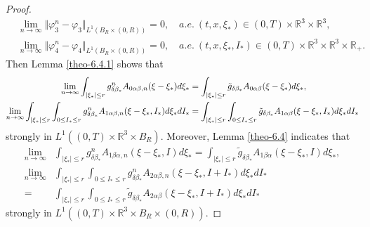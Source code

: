\documentclass[10pt,a4paper]{amsart}
\def\R{\mathbb{R}}
\begin{document}
\begin{proof}
\begin{equation*}
\begin{aligned}
		& \lim \limits_{n\rightarrow \infty } \Vert \varphi^n_3 -\varphi_3 \Vert_{L^1(B_R\times (0,R))}=0, \quad a.e. \ (t,x,\xi_*) \in (0,T)\times \R^3 \times \R^3, \\
		& \lim \limits_{n\rightarrow \infty } \Vert \varphi^n_4 -\varphi_4 \Vert_{L^1(B_R\times (0,R) )}=0, \quad a.e. \ (t,x,\xi_* ,I_*) \in (0,T)\times \R^3 \times \R^3 \times \R_+ . 
	\end{aligned}
\end{equation*}
Then Lemma \ref{theo-6.4.1} shows that
\begin{equation*}{\small
	\begin{aligned}
		\lim \limits_{n\rightarrow \infty } \int_{|\xi_* |\leq r} g^n_{\delta \beta_* } A_{0\alpha \beta ,n}(\xi -\xi_* ) d\xi_* &=\int_{|\xi_* |\leq r} \tilde{g}_{\delta \beta_*} A_{0\alpha \beta } (\xi -\xi_* )d\xi_*, \\
		\lim \limits_{n\rightarrow \infty } \int_{|\xi_* |\leq r} \int_{0\leq I_* \leq r} g^n_{\delta \beta_*} A_{1\alpha \beta ,n}(\xi -\xi_* ,I_* ) d\xi_* dI_*&=\int_{|\xi_* |\leq r} \int_{0\leq I_* \leq r} \tilde{g}_{\delta \beta_*} A_{1\alpha \beta } (\xi -\xi_* ,I_* )d\xi_* dI_*
	\end{aligned}}
\end{equation*}
strongly in $L^1((0,T)\times \R^3 \times B_R )$. Moreover, Lemma \ref{theo-6.4} indicates that
\begin{equation*}
	\begin{aligned}
		\lim \limits_{n\rightarrow \infty } &\int_{|\xi_* |\leq r} g^n_{\delta \beta_*} A_{1\beta \alpha ,n}(\xi -\xi_* ,I) d\xi_* =\int_{|\xi_* |\leq r} \tilde{g}_{\delta \beta_*} A_{1\beta \alpha }(\xi -\xi_* ,I) d\xi_*, \\
		\lim \limits_{n\rightarrow \infty } &\int_{|\xi_* |\leq r} \int_{0\leq I_* \leq r} g^n_{\delta \beta_*} A_{2\alpha \beta ,n}(\xi -\xi_* ,I+I_* ) d\xi_* dI_*\\
		=&\int_{|\xi_* |\leq r} \int_{0\leq I_* \leq r} \tilde{g}_{\delta \beta_*} A_{2\alpha \beta }(\xi -\xi_* ,I+I_* ) d\xi_* dI_*
	\end{aligned}
\end{equation*}
strongly in $L^1((0,T)\times \R^3 \times B_R \times (0,R))$.


\end{proof}
\end{document}
